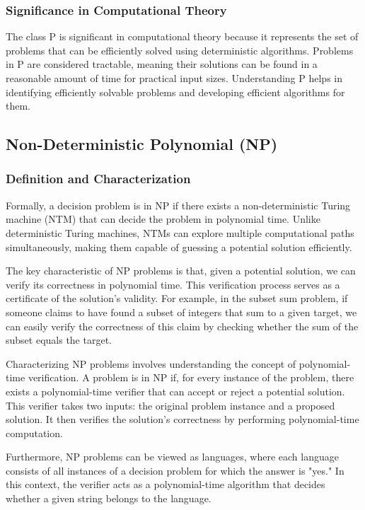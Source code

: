 \documentclass[12pt]{book} %
\begin{document}
\subsubsection{Significance in Computational Theory}
The class P is significant in computational theory because it represents the set of problems that can be efficiently solved using deterministic algorithms. Problems in P are considered tractable, meaning their solutions can be found in a reasonable amount of time for practical input sizes. Understanding P helps in identifying efficiently solvable problems and developing efficient algorithms for them.

\subsection{Non-Deterministic Polynomial (NP)}

\subsubsection{Definition and Characterization}
Formally, a decision problem is in NP if there exists a non-deterministic Turing machine (NTM) that can decide the problem in polynomial time. Unlike deterministic Turing machines, NTMs can explore multiple computational paths simultaneously, making them capable of guessing a potential solution efficiently.

The key characteristic of NP problems is that, given a potential solution, we can verify its correctness in polynomial time. This verification process serves as a certificate of the solution's validity. For example, in the subset sum problem, if someone claims to have found a subset of integers that sum to a given target, we can easily verify the correctness of this claim by checking whether the sum of the subset equals the target.

Characterizing NP problems involves understanding the concept of polynomial-time verification. A problem is in NP if, for every instance of the problem, there exists a polynomial-time verifier that can accept or reject a potential solution. This verifier takes two inputs: the original problem instance and a proposed solution. It then verifies the solution's correctness by performing polynomial-time computation.

Furthermore, NP problems can be viewed as languages, where each language consists of all instances of a decision problem for which the answer is "yes." In this context, the verifier acts as a polynomial-time algorithm that decides whether a given string belongs to the language.
\end{document}
